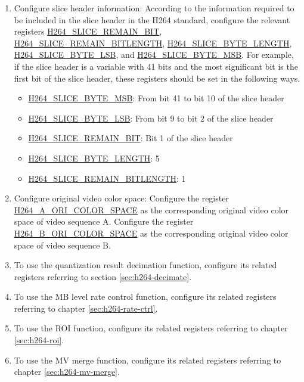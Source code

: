 \documentclass[main\_\_EN.tex]{subfiles}
\begin{document}
\begin{enumerate}
\begin{enumerate}
        \item Configure slice header information: According to the information required to be included in the slice header in the H264 standard, configure the relevant registers \hyperref[fielddesc:H264SLICEREMAINBIT]{H264\_SLICE\_REMAIN\_BIT}, \hyperref[fielddesc:H264SLICEREMAINBITLENGTH]{H264\_SLICE\_REMAIN\_BITLENGTH}, \hyperref[fielddesc:H264SLICEBYTELENGTH]{H264\_SLICE\_BYTE\_LENGTH}, \hyperref[fielddesc:H264SLICEBYTELSB]{H264\_SLICE\_BYTE\_LSB}, and \hyperref[fielddesc:H264SLICEBYTEMSB]{H264\_SLICE\_BYTE\_MSB}. For example, if the slice header is a variable with 41 bits and the most significant bit is the first bit of the slice header, these registers should be set in the following ways.
            \begin{itemize}
                \item \hyperref[fielddesc:H264SLICEBYTEMSB]{H264\_SLICE\_BYTE\_MSB}: From bit 41 to bit 10 of the slice header
                \item \hyperref[fielddesc:H264SLICEBYTELSB]{H264\_SLICE\_BYTE\_LSB}: From bit 9 to bit 2 of the slice header
                \item \hyperref[fielddesc:H264SLICEREMAINBIT]{H264\_SLICE\_REMAIN\_BIT}: Bit 1 of the slice header
                \item \hyperref[fielddesc:H264SLICEBYTELENGTH]{H264\_SLICE\_BYTE\_LENGTH}: 5
                \item \hyperref[fielddesc:H264SLICEREMAINBITLENGTH]{H264\_SLICE\_REMAIN\_BITLENGTH}: 1
            \end{itemize}
        \item Configure original video color space: Configure the register \hyperref[fielddesc:H264AORICOLORSPACE]{H264\_A\_ORI\_COLOR\_SPACE} as the corresponding original video color space of video sequence A. Configure the register \hyperref[fielddesc:H264BORICOLORSPACE]{H264\_B\_ORI\_COLOR\_SPACE} as the corresponding original video color space of video sequence B.
        \item To use the quantization result decimation function, configure its related registers referring to section \ref{sec:h264-decimate}.
        \item To use the MB level rate control function, configure its related registers referring to chapter \ref{sec:h264-rate-ctrl}.
        \item To use the ROI function, configure its related registers referring to chapter \ref{sec:h264-roi}.
        \item To use the MV merge function, configure its related registers referring to chapter \ref{sec:h264-mv-merge}.

\end{enumerate}
\end{enumerate}
\end{document}
